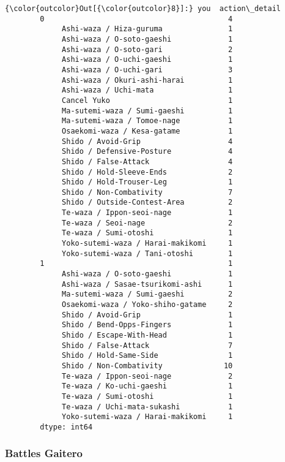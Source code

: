 \documentclass[11pt]{article}
\begin{document}
\begin{Verbatim}[commandchars=\\\{\}]
{\color{outcolor}Out[{\color{outcolor}8}]:} you  action\_detail                    
        0                                          4
             Ashi-waza / Hiza-guruma               1
             Ashi-waza / O-soto-gaeshi             1
             Ashi-waza / O-soto-gari               2
             Ashi-waza / O-uchi-gaeshi             1
             Ashi-waza / O-uchi-gari               3
             Ashi-waza / Okuri-ashi-harai          1
             Ashi-waza / Uchi-mata                 1
             Cancel Yuko                           1
             Ma-sutemi-waza / Sumi-gaeshi          1
             Ma-sutemi-waza / Tomoe-nage           1
             Osaekomi-waza / Kesa-gatame           1
             Shido / Avoid-Grip                    4
             Shido / Defensive-Posture             4
             Shido / False-Attack                  4
             Shido / Hold-Sleeve-Ends              2
             Shido / Hold-Trouser-Leg              1
             Shido / Non-Combativity               7
             Shido / Outside-Contest-Area          2
             Te-waza / Ippon-seoi-nage             1
             Te-waza / Seoi-nage                   2
             Te-waza / Sumi-otoshi                 1
             Yoko-sutemi-waza / Harai-makikomi     1
             Yoko-sutemi-waza / Tani-otoshi        1
        1                                          1
             Ashi-waza / O-soto-gaeshi             1
             Ashi-waza / Sasae-tsurikomi-ashi      1
             Ma-sutemi-waza / Sumi-gaeshi          2
             Osaekomi-waza / Yoko-shiho-gatame     2
             Shido / Avoid-Grip                    1
             Shido / Bend-Opps-Fingers             1
             Shido / Escape-With-Head              1
             Shido / False-Attack                  7
             Shido / Hold-Same-Side                1
             Shido / Non-Combativity              10
             Te-waza / Ippon-seoi-nage             2
             Te-waza / Ko-uchi-gaeshi              1
             Te-waza / Sumi-otoshi                 1
             Te-waza / Uchi-mata-sukashi           1
             Yoko-sutemi-waza / Harai-makikomi     1
        dtype: int64
\end{Verbatim}
            
    \subsubsection{Battles Gaitero}\label{battles-gaitero}
\end{document}
